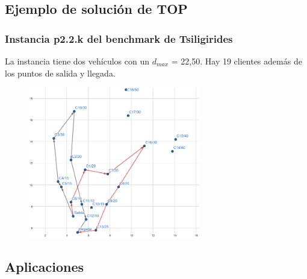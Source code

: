 \documentclass{beamer}
\begin{document}

\subsection{Ejemplo de solución de TOP}

\begin{frame}
\frametitle{Instancia p2.2.k del benchmark de Tsiligirides}

La instancia tiene dos vehículos con un $d_{max}$ = 22,50. Hay 19 clientes además de los puntos de salida y llegada.%

\begin{figure}[h]
	\centering
	\includegraphics[width=7.5cm]{400cropped}
	\label{fig:400cropped}
\end{figure}


\end{frame}


\subsection{Aplicaciones}
\end{document}
